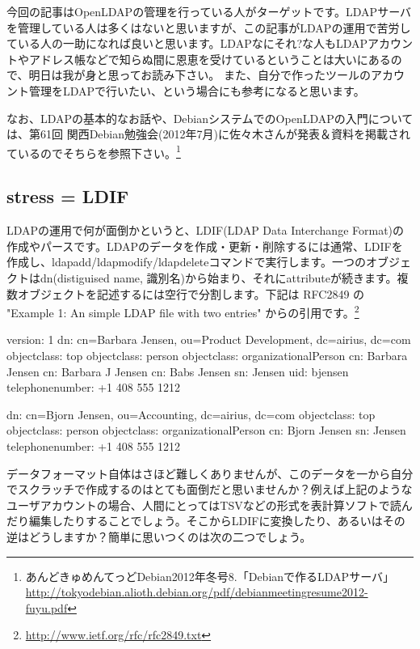 \documentclass[mingoth,a4paper]{jsarticle}
\begin{document}
今回の記事はOpenLDAPの管理を行っている人がターゲットです。LDAPサーバを管理している人は多くはないと思いますが、この記事がLDAPの運用で苦労している人の一助になれば良いと思います。LDAPなにそれ?な人もLDAPアカウントやアドレス帳などで知らぬ間に恩恵を受けているということは大いにあるので、明日は我が身と思ってお読み下さい。
また、自分で作ったツールのアカウント管理をLDAPで行いたい、という場合にも参考になると思います。

なお、LDAPの基本的なお話や、DebianシステムでのOpenLDAPの入門については、第61回 関西Debian勉強会(2012年7月)に佐々木さんが発表＆資料を掲載されているのでそちらを参照下さい。\footnote{あんどきゅめんてっどDebian2012年冬号8.「Debianで作るLDAPサーバ」 \url{http://tokyodebian.alioth.debian.org/pdf/debianmeetingresume2012-fuyu.pdf}}

\subsection{stress = LDIF}

LDAPの運用で何が面倒かというと、LDIF(LDAP Data Interchange Format)の作成やパースです。LDAPのデータを作成・更新・削除するには通常、LDIFを作成し、ldapadd/ldapmodify/ldapdeleteコマンドで実行します。一つのオブジェクトはdn(distiguised name, 識別名)から始まり、それにattributeが続きます。複数オブジェクトを記述するには空行で分割します。下記は RFC2849 の "Example 1: An simple LDAP file with two entries" からの引用です。\footnote{\url{http://www.ietf.org/rfc/rfc2849.txt}}

\begin{commandline}
version: 1
dn: cn=Barbara Jensen, ou=Product Development, dc=airius, dc=com
objectclass: top
objectclass: person
objectclass: organizationalPerson
cn: Barbara Jensen
cn: Barbara J Jensen
cn: Babs Jensen
sn: Jensen
uid: bjensen
telephonenumber: +1 408 555 1212

dn: cn=Bjorn Jensen, ou=Accounting, dc=airius, dc=com
objectclass: top
objectclass: person
objectclass: organizationalPerson
cn: Bjorn Jensen
sn: Jensen
telephonenumber: +1 408 555 1212
\end{commandline}

データフォーマット自体はさほど難しくありませんが、このデータを一から自分でスクラッチで作成するのはとても面倒だと思いませんか？例えば上記のようなユーザアカウントの場合、人間にとってはTSVなどの形式を表計算ソフトで読んだり編集したりすることでしょう。そこからLDIFに変換したり、あるいはその逆はどうしますか？簡単に思いつくのは次の二つでしょう。
\end{document}
